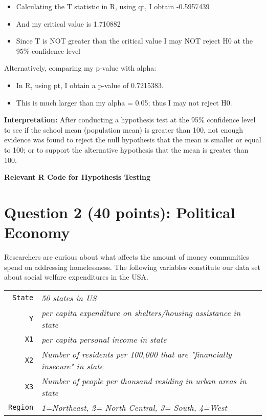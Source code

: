 \documentclass[12pt,letterpaper]{article}
\begin{document}
\begin{itemize}
\item Calculating the T statistic in R, using qt, I obtain -0.5957439 
\item And my critical value is  1.710882
\item Since T is NOT greater than the critical value I may NOT reject H0 at the 95\% confidence level
\end{itemize}

Alternatively, comparing my p-value with alpha: 

\begin{itemize}
\item In R, using pt, I obtain a p-value of 0.7215383. 
\item This is much larger than my alpha = 0.05; thus I may not reject H0.
\end{itemize}

\noindent \textbf{Interpretation:} After conducting a hypothesis test at the 95\% confidence level to see if the school mean (population mean) is greater than 100, not enough evidence was found to reject the null hypothesis that the mean is smaller or equal to 100; or to support the alternative hypothesis that the mean is greater than 100. 

\newpage

\noindent \textbf {Relevant R Code for Hypothesis Testing}



\newpage

\newpage

	\section*{Question 2 (40 points): Political Economy}

\noindent Researchers are curious about what affects the amount of money communities spend on addressing homelessness. The following variables constitute our data set about social welfare expenditures in the USA. \\
\vspace{.5cm}


\begin{tabular}{r|l}
	\texttt{State} &\emph{50 states in US} \\
	\texttt{Y} & \emph{per capita expenditure on shelters/housing assistance in state}\\
	\texttt{X1} &\emph{per capita personal income in state} \\
	\texttt{X2} &  \emph{Number of residents per 100,000 that are "financially insecure" in state}\\
	\texttt{X3} &  \emph{Number of people per thousand residing in urban areas in state} \\
	\texttt{Region} &  \emph{1=Northeast, 2= North Central, 3= South, 4=West} \\
\end{tabular}
\end{document}
